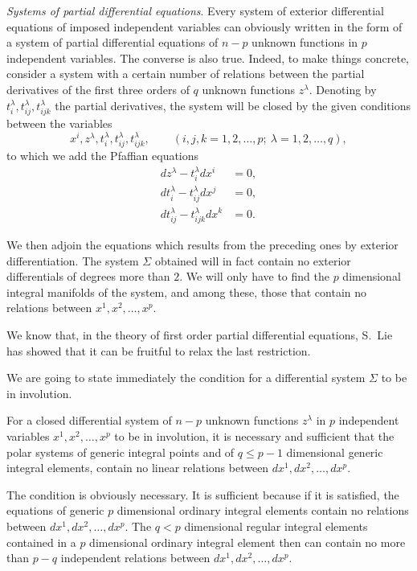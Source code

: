 \vspace{12pt}\fsec \emph{Systems of partial differential equations}. Every system of exterior differential equations of imposed independent variables can obviously written in the form of a system of partial differential equations of $n-p$ unknown functions in $p$ independent variables. The converse is also true. Indeed, to make things concrete, consider a system with a certain number of relations between  the partial derivatives of the first three orders of $q$ unknown functions $z^{\lambda}$. Denoting by $t_{i}^{\lambda},t_{ij}^{\lambda},t_{ijk}^{\lambda}$ the partial derivatives, the system will be closed by the given conditions between the variables
\[
x^{i},z^{\lambda},t_{i}^{\lambda},t_{ij}^{\lambda},t_{ijk}^{\lambda},\qquad(i,j,k=1,2,\dots,p;\ \lambda=1,2,\dots,q),
\]
to which we add the Pfaffian equations
\begin{align*}
  dz^{\lambda}-t_{i}^{\lambda}dx^{i}&=0,\\
  dt_{i}^{\lambda}-t_{ij}^{\lambda}dx^{j}&=0,\\
  dt_{ij}^{\lambda}-t_{ijk}^{\lambda}dx^{k}&=0.
\end{align*}

We then adjoin the equations which results from the preceding ones by exterior differentiation. The system $\Sigma$ obtained will in fact contain no exterior differentials of degrees more than $2$. We will only have to find the $p$ dimensional integral manifolds of the system, and among these, those that contain no relations between $x^{1},x^{2},\dots,x^{p}$.

We know that, in the theory of first order partial differential equations, S.~Lie has showed that it can be fruitful to relax the last restriction.



\vspace{12pt}\fsec We are going to state immediately the condition for a differential system $\Sigma$ to be in involution.
\begin{thm*}
  For a closed differential system of $n-p$ unknown functions $z^{\lambda}$ in $p$ independent variables $x^{1},x^{2},\dots,x^{p}$ to be in involution, it is necessary and sufficient that the polar systems of  generic integral points and of  $q\le p-1$ dimensional generic integral elements, contain no linear relations between $dx^{1},dx^{2},\dots,dx^{p}$.
\end{thm*}

The condition is obviously necessary. It is sufficient because if it is satisfied, the equations of generic $p$ dimensional ordinary integral elements contain no relations between $dx^{1},dx^{2},\dots,dx^{p}$. The $q<p$ dimensional regular integral elements contained in a $p$ dimensional ordinary integral element then can contain no more than $p-q$ independent relations between $dx^{1},dx^{2},\dots,dx^{p}$.


